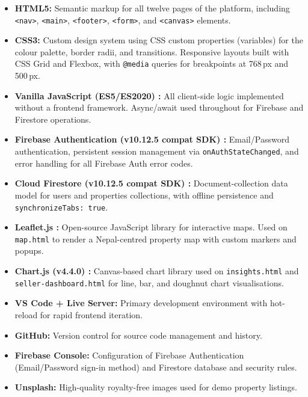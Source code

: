 \documentclass[12pt,a4paper]{report}
\begin{document}
\begin{itemize}[leftmargin=2.5em]
  \item \textbf{HTML5:} Semantic markup for all twelve pages of the platform,
    including \texttt{<nav>}, \texttt{<main>}, \texttt{<footer>}, \texttt{<form>},
    and \texttt{<canvas>} elements.
  \item \textbf{CSS3:} Custom design system using CSS custom properties (variables)
    for the colour palette, border radii, and transitions. Responsive layouts
    built with CSS Grid and Flexbox, with \texttt{@media} queries for breakpoints
    at 768\,px and 500\,px.
  \item \textbf{Vanilla JavaScript (ES5/ES2020) \cite{mdn2024}:} All client-side logic
    implemented without a frontend framework. Async/await used throughout for
    Firebase and Firestore operations.
  \item \textbf{Firebase Authentication (v10.12.5 compat SDK) \cite{firebase2024}:}
    Email/Password authentication, persistent session management via
    \texttt{onAuthStateChanged}, and error handling for all Firebase Auth error
    codes.
  \item \textbf{Cloud Firestore (v10.12.5 compat SDK) \cite{firestore2024}:}
    Document-collection data model for users and properties collections, with
    offline persistence and \texttt{synchronizeTabs: true}.
  \item \textbf{Leaflet.js \cite{leaflet2024}:} Open-source JavaScript library for interactive maps.
    Used on \texttt{map.html} to render a Nepal-centred property map with
    custom markers and popups.
  \item \textbf{Chart.js (v4.4.0) \cite{chartjs2024}:} Canvas-based chart library used on
    \texttt{insights.html} and \texttt{seller-dashboard.html} for line, bar,
    and doughnut chart visualisations.
  \item \textbf{VS Code + Live Server:} Primary development environment with
    hot-reload for rapid frontend iteration.
  \item \textbf{GitHub:} Version control for source code management and history.
  \item \textbf{Firebase Console:} Configuration of Firebase Authentication
    (Email/Password sign-in method) and Firestore database and security rules.
  \item \textbf{Unsplash:} High-quality royalty-free images used for demo
    property listings.
\end{itemize}
\end{document}
